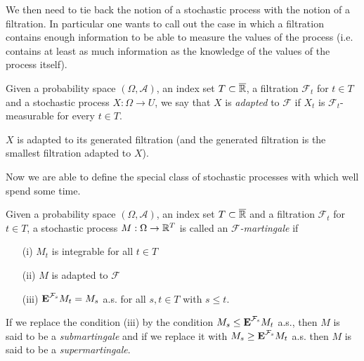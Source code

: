 We then need to tie back the notion of a stochastic process with the
notion of a filtration.  In particular one wants to call out the case
in which a filtration contains enough information to be able to
measure the values of the process (i.e. contains at least as much
information as the knowledge of the values of the process itself).
\begin{defn}Given a probability space $(\Omega,  \mathcal{A})$, an
  index set $T \subset \overline{\mathbb{R}}$, a
  filtration $\mathcal{F}_t$ for $t \in T$ and a stochastic process $X
  : \Omega \to U$, we say that $X$ is \emph{adapted} to $\mathcal{F}$
  if $X_t$ is $\mathcal{F}_t$-measurable for every $t \in T$.
\end{defn}

\begin{examp}$X$ is adapted to its generated filtration (and the
  generated filtration is the smallest filtration adapted to $X$).
\end{examp}

Now we are able to define the special class of stochastic processes
with which well spend some time.
\begin{defn}Given a probability space $(\Omega,  \mathcal{A})$, an
  index set $T \subset \overline{\mathbb{R}}$ and a
  filtration $\mathcal{F}_t$ for $t \in T$, a stochastic process $M :
  \Omega \to \mathbb{R}^T$ is called an \emph{$\mathcal{F}$-martingale} if 
\begin{itemize}
\item[(i)]$M_t$ is integrable for all $t \in T$
\item[(ii)]$M$ is adapted to $\mathcal{F}$
\item[(iii)]$\textbf{E}^{\mathcal{F}_s} M_t = M_s$ a.s. for all
  $s,t \in T$ with $s \leq t$.
\end{itemize}
If we replace the condition (iii) by the condition
$M_s \leq \textbf{E}^{\mathcal{F}_s} M_t$ a.s., then $M$ is said to
be a \emph{submartingale} and if we replace it with
$M_s \geq \textbf{E}^{\mathcal{F}_s} M_t $ a.s. then $M$ is said to be a
\emph{supermartingale}.
\end{defn}

